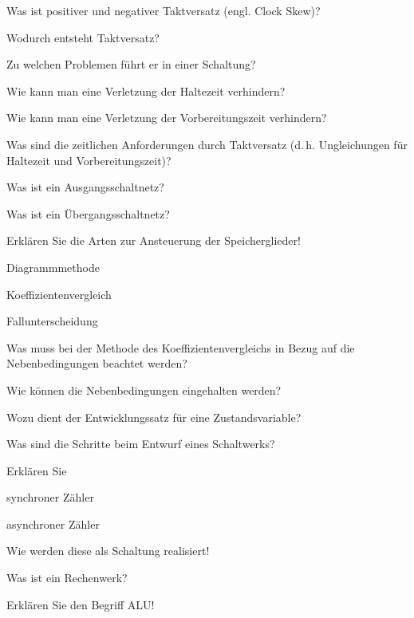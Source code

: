 \documentclass
[
  draft    = true,
  fontsize = 11pt,
  parskip  = half-,
  BCOR     = 0pt,
  DIV      = 11,
  ngerman,
  dvipsnames
]
{scrartcl}
\begin{document}
\begin{mytemize}
  \item Was ist positiver und negativer Taktversatz (engl. Clock Skew)?
  \item Wodurch entsteht Taktversatz?
        \begin{mytemize}
          \item Zu welchen Problemen führt er in einer Schaltung?
        \end{mytemize}
  \item Wie kann man eine Verletzung der Haltezeit verhindern?
  \item Wie kann man eine Verletzung der Vorbereitungszeit verhindern?
  \item Was sind die zeitlichen Anforderungen durch Taktversatz (d.\,h. Ungleichungen für Haltezeit und Vorbereitungszeit)?
  \item Was ist ein Ausgangsschaltnetz?
  \item Was ist ein Übergangsschaltnetz?
  \item Erklären Sie die Arten zur Ansteuerung der Speicherglieder!
        \begin{mytemize}
          \item Diagrammmethode
          \item Koeffizientenvergleich
          \item Fallunterscheidung
        \end{mytemize}
  \item Was muss bei der Methode des Koeffizientenvergleichs in Bezug auf die Nebenbedingungen beachtet werden?
        \begin{mytemize}
          \item Wie können die Nebenbedingungen eingehalten werden?
        \end{mytemize}
  \item Wozu dient der Entwicklungssatz für eine Zustandsvariable?
  \item Was sind die Schritte beim Entwurf eines Schaltwerks?
  \item Erklären Sie
        \begin{mytemize}
          \item synchroner Zähler
          \item asynchroner Zähler
          \item Wie werden diese als Schaltung realisiert!
        \end{mytemize}
  \item Was ist ein Rechenwerk?
  \item Erklären Sie den Begriff ALU!

\end{mytemize}
\end{document}
